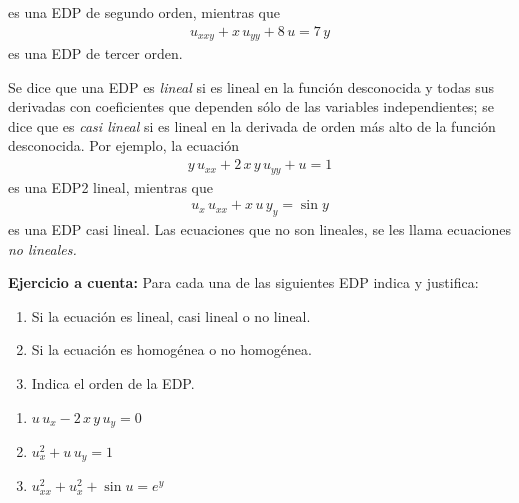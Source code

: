 es una EDP de segundo orden, mientras que
\begin{align*}
u_{x x y} + x \, u_{y y} + 8 \, u = 7 \, y
\end{align*}
es una EDP de tercer orden.
\par
Se dice que una EDP es \emph{lineal} si es lineal en la función desconocida y todas sus derivadas con coeficientes que dependen sólo de las variables independientes; se dice que es \emph{casi lineal} si es lineal en la derivada de orden más alto de la función desconocida. Por ejemplo, la ecuación
\begin{align*}
y \, u_{xx} + 2 \, x \, y \, u_{yy} + u = 1
\end{align*}
es una EDP2 lineal, mientras que
\begin{align*}
u_{x} \, u_{x x} + x \, u \, y_{y} = \sin y
\end{align*}
es una EDP casi lineal. Las ecuaciones que no son lineales, se les llama ecuaciones \emph{no lineales.}
\par
\textbf{Ejercicio a cuenta: } Para cada una de las siguientes EDP indica y justifica:
\begin{enumerate}[label=\alph*)]
\item Si la ecuación es lineal, casi lineal o no lineal.
\item Si la ecuación es homogénea o no homogénea.
\item Indica el orden de la EDP.
\end{enumerate}
\begin{enumerate}[label=(\roman*)]
\item $u \, u_{x} - 2 \, x \, y \, u_{y} = 0$
\item $u_{x}^{2} + u \, u_{y} = 1$
\item $u_{xx}^{2} + u_{x}^{2} + \sin u =  e^{y}$
\end{enumerate}

